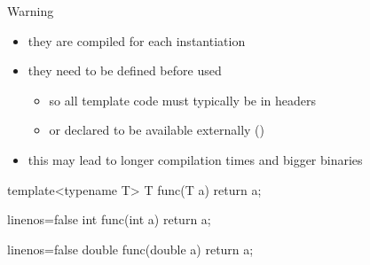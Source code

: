 \begin{frame}[fragile]
  \begin{alertblock}{Warning}
    \begin{itemize}
      \item they are compiled for each instantiation
      \item they need to be defined before used
      \begin{itemize}
        \item so all template code must typically be in headers
        \item or declared to be available externally ()
      \end{itemize}
      \item this may lead to longer compilation times and bigger binaries
    \end{itemize}
  \end{alertblock}
  \newsavebox{\codepiece}
  \begin{lrbox}{\codepiece}
    \begin{minipage}{.35\linewidth}
      \small
      \begin{cppcode*}{}
        template<typename T>
        T func(T a) {
          return a;
        }
      \end{cppcode*}
    \end{minipage}
  \end{lrbox}
  \newsavebox{\codepiecea}
  \begin{lrbox}{\codepiecea}
    \begin{minipage}{.4\linewidth}
      \small
      \begin{cppcode*}{linenos=false}
        int func(int a) {
          return a;
        }
      \end{cppcode*}
    \end{minipage}
  \end{lrbox}
  \newsavebox{\codepieceb}
  \begin{lrbox}{\codepieceb}
    \begin{minipage}{.4\linewidth}
      \small
      \begin{cppcode*}{linenos=false}
        double func(double a) {
          return a;
        }
      \end{cppcode*}
    \end{minipage}
  \end{lrbox}
\end{frame}

